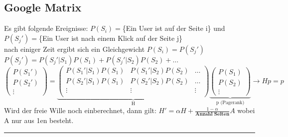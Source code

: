 \subsection{Google Matrix}
	Es gibt folgende Ereignisse: $P(S_i)=$\{Ein User ist auf der Seite i\} und \\
	\hspace*{43.3mm}$P(S_j')=$\{Ein User ist nach einem Klick auf der Seite j\} \\
	nach einiger Zeit ergibt sich ein Gleichgewicht $P(S_i)=P(S_j')$ \\
	$P(S_j')=P(S_j'|S_1)P(S_1)+P(S_j'|S_2)P(S_2)+\dots$ \\
	$\begin{pmatrix}P(S_1')\\P(S_2')\\\vdots\end{pmatrix} = 
	\underbrace{\begin{pmatrix}P(S_1'|S_1)P(S_1) & P(S_1'|S_2)P(S_2) & \ldots \\
	P(S_2'|S_1)P(S_1) & P(S_2'|S_2)P(S_2) & \ldots \\
	\vdots & \vdots & \vdots \\
	\end{pmatrix}}_{\text{H}}
	\underbrace{\begin{pmatrix}P(S_1)\\P(S_2)\\\vdots\end{pmatrix}}_{\text{p (Pagerank)}} \rightarrow Hp=p$ \\
	Wird der freie Wille noch einberechnet, dann gilt: $H'=\alpha H+\frac{1-\alpha}{\textbf{Anzahl Seiten}}A$ wobei A nur aus 1en besteht.\\
	
\hrule
